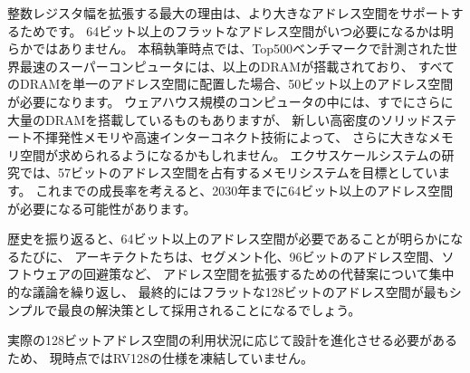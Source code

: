 \begin{commentary}
\begin{comment}
The primary reason to extend integer register width is to support
larger address spaces.  It is not clear when a flat address space larger
than 64 bits will be required.  At the time of writing, the fastest
supercomputer in the world as measured by the Top500 benchmark had
over \wunits{1}{PB} of DRAM, and would require over 50 bits of address
space if all the DRAM resided in a single address space.  Some
warehouse-scale computers already contain even larger quantities of
DRAM, and new dense solid-state non-volatile memories and fast
interconnect technologies might drive a demand for even larger memory
spaces.  Exascale systems research is targeting \wunits{100}{PB}
memory systems, which occupy 57 bits of address space.  At historic
rates of growth, it is possible that greater than 64 bits of address
space might be required before 2030.
\end{comment}

整数レジスタ幅を拡張する最大の理由は、より大きなアドレス空間をサポートするためです。
64ビット以上のフラットなアドレス空間がいつ必要になるかは明らかではありません。
本稿執筆時点では、Top500ベンチマークで計測された世界最速のスーパーコンピュータには、以上のDRAMが搭載されており、
すべてのDRAMを単一のアドレス空間に配置した場合、50ビット以上のアドレス空間が必要になります。 
ウェアハウス規模のコンピュータの中には、すでにさらに大量のDRAMを搭載しているものもありますが、
新しい高密度のソリッドステート不揮発性メモリや高速インターコネクト技術によって、
さらに大きなメモリ空間が求められるようになるかもしれません。
エクサスケールシステムの研究では、57ビットのアドレス空間を占有するメモリシステムを目標としています。
これまでの成長率を考えると、2030年までに64ビット以上のアドレス空間が必要になる可能性があります。

\begin{comment}
History suggests that whenever it becomes clear that more than 64 bits
of address space is needed, architects will repeat intensive debates
about alternatives to extending the address space, including
segmentation, 96-bit address spaces, and software workarounds, until,
finally, flat 128-bit address spaces will be adopted as the simplest
and best solution.
\end{comment}

歴史を振り返ると、64ビット以上のアドレス空間が必要であることが明らかになるたびに、
アーキテクトたちは、セグメント化、96ビットのアドレス空間、ソフトウェアの回避策など、
アドレス空間を拡張するための代替案について集中的な議論を繰り返し、
最終的にはフラットな128ビットのアドレス空間が最もシンプルで最良の解決策として採用されることになるでしょう。

\begin{comment}
We have not frozen the RV128 spec at this time, as there might be need
to evolve the design based on actual usage of 128-bit address spaces.
\end{comment}

実際の128ビットアドレス空間の利用状況に応じて設計を進化させる必要があるため、
現時点ではRV128の仕様を凍結していません。

\end{commentary}

